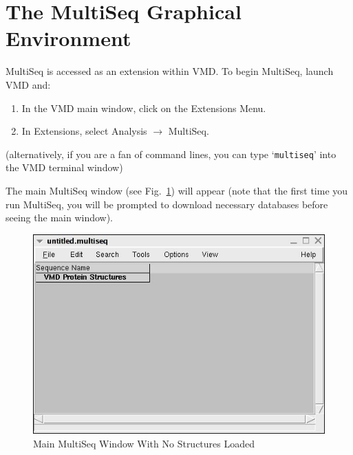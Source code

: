 \label{unit1}

\section{The MultiSeq Graphical Environment}
MultiSeq is accessed as an extension within VMD.  To begin MultiSeq,
launch VMD and:
\begin{enumerate}
\item In the VMD main window, click on the \textsf{Extensions} Menu.
\item In Extensions, select \textsf{Analysis} $\rightarrow$
\textsf{MultiSeq}.
\end{enumerate}
(alternatively, if you are a fan of command lines, you can type
`\texttt{multiseq}' into the VMD terminal window)

The main MultiSeq window (see Fig.~\ref{fig:main}) will appear (note
that the first time you run MultiSeq, you will be prompted to download
necessary databases before seeing the main window).

\begin{figure}[here]
 \centerline{\includegraphics [width=5in]{./pictures/main_window.jpg}}
 \caption{Main MultiSeq Window With No Structures Loaded}%
\label{fig:main}
\end{figure}

